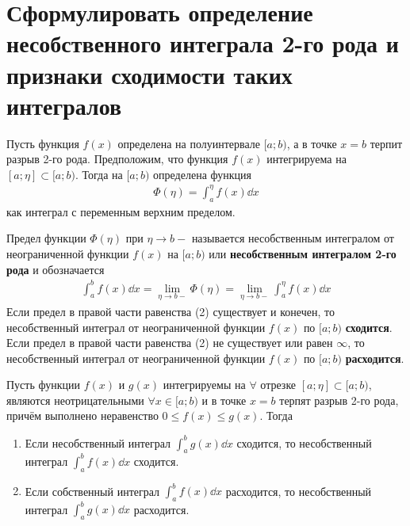 \section{Сформулировать определение несобственного интеграла 2-го рода и признаки сходимости таких интегралов} 
\setcounter{equation}{0}
Пусть функция $f(x)$ определена на полуинтервале $[a;b)$, а в точке $x = b$ терпит разрыв 2-го рода. Предположим, что функция $f(x)$ интегрируема на $[a; \eta] \subset [a;b)$. Тогда на $[a; b)$ определена функция
\begin{gather}
    \Phi (\eta) = \int_{a}^{\eta} f(x)\dd{x}
\end{gather}
как интеграл с переменным верхним пределом. 
\begin{definition}
    Предел функции $\Phi (\eta)$ при $\eta \to b-$ называется несобственным интегралом от неограниченной функции $f(x)$ на $[a;b)$ или \textbf{несобственным интегралом 2-го рода} и обозначается
    \begin{gather}
        \boxed{\int_{a}^{b} f(x)\dd{x} = \lim\limits_{\eta \to b-} \Phi (\eta) = \lim\limits_{\eta \to b-} \int_{a}^{\eta} f(x)\dd{x}}
    \end{gather}
    Если предел в правой части равенства (2) существует и конечен, то несобственный интеграл от неограниченной функции $f(x)$ по $[a;b)$ \textbf{сходится}.\\
    Если предел в правой части равенства (2) не существует или равен $\infty$, то несобственный интеграл от неограниченной функции $f(x)$ по $[a;b)$ \textbf{расходится}.
\end{definition}

\begin{theorem}
    Пусть функции $f(x)$ и $g(x)$ интегрируемы на $\forall$ отрезке $[a; \eta] \subset [a; b)$, являются неотрицательными $\forall x \in [a;b)$ и в точке $x = b$ терпят разрыв 2-го рода, причём выполнено неравенство $0 \leqslant f(x) \leqslant g(x)$. Тогда
    \begin{enumerate}
        \item Если несобственный интеграл $\int_{a}^{b} g(x)\dd{x}$ сходится, то несобственный интеграл $\int_{a}^{b} f(x)\dd{x}$ сходится.
        \item Если собственный интеграл $\int_{a}^{b} f(x)\dd{x}$ расходится, то несобственный интеграл $\int_{a}^{b} g(x)\dd{x}$ расходится.
    \end{enumerate}
\end{theorem}

